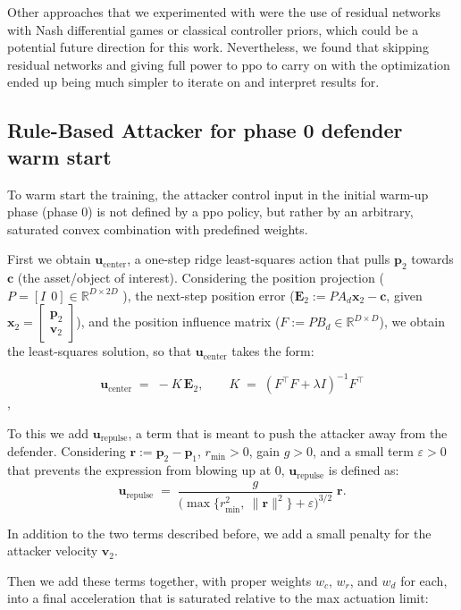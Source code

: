 Other approaches that we experimented with were the use of residual networks with Nash differential games or classical controller priors, which could be a potential future direction for this work. Nevertheless, we found that skipping residual networks and giving full power to \acs{ppo} to carry on with the optimization ended up being much simpler to iterate on and interpret results for.

\subsection{Rule-Based Attacker for phase 0 defender warm start}
\label{subsec:rule-based-attacker-warm-start}
To warm start the training, the attacker control input in the initial warm-up phase (phase 0) is not defined by a \acs{ppo} policy, but rather by an arbitrary, saturated convex combination with predefined weights.

First we obtain $\mathbf{u}_{\text{center}}$, a one-step ridge least-squares action that pulls \(\mathbf{p}_2\) towards \(\mathbf{c}\) (the asset/object of interest). Considering the position projection (\(P=[I\ \ 0]\in\mathbb{R}^{D\times 2D}\) ), the next-step position error (\(\mathbf{E}_2:= P A_d \mathbf{x}_2 - \mathbf{c}\), given \(\mathbf{x}_2=\begin{bmatrix}\mathbf{p}_2\\ \mathbf{v}_2\end{bmatrix}\)), and the position influence matrix (\(F := P B_d \in\mathbb{R}^{D\times D}\)), we obtain the least-squares solution, so that $\mathbf{u}_{\text{center}}$ takes the form:

\[
\mathbf{u}_{\text{center}} \;=\; - K\,\mathbf{E}_2,\qquad
K \;=\; (F^\top F + \lambda I)^{-1} F^\top
\],

To this we add \(\mathbf{u}_{\text{repulse}}\), a term that is meant to push the attacker away from the defender. Considering \(\mathbf{r} := \mathbf{p}_2-\mathbf{p}_1\), \(r_{\min}>0\), gain \(g>0\), and a small term \(\varepsilon > 0\) that prevents the expression from blowing up at 0, \(\mathbf{u}_{\text{repulse}}\) is defined as:
\[
\mathbf{u}_{\text{repulse}} \;=\; \frac{g}{\big(\max\{r_{\min}^2,\ \|\mathbf{r}\|^2\}+\varepsilon\big)^{3/2}}\; \mathbf{r}.
\]

In addition to the two terms described before, we add a small penalty for the attacker velocity \(\mathbf{v}_2\).


Then we add these terms together, with proper weights $w_c$, $w_r$, and $w_d$ for each, into a final acceleration that is saturated relative to the max actuation limit:



